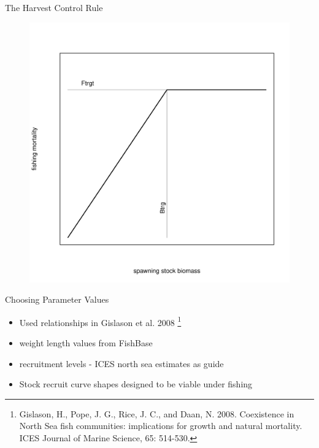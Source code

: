 \documentclass{beamer}
\begin{document}
\begin{withoutheadline}
\begin{frame}{The Harvest Control Rule}
  \begin{figure}
    \begin{center}
    \includegraphics[width=.65\textwidth]{hcr}    
    \end{center}
  \end{figure}
\end{frame}
\end{withoutheadline}



\begin{withoutheadline}
\begin{frame}{Choosing Parameter Values}
  \begin{itemize}
    \item Used relationships in Gislason et al. 2008 \footnote{Gislason, H., Pope, J. G., Rice, J. C., and Daan, N. 2008. Coexistence in North Sea fish communities: implications for growth and natural mortality. ICES Journal of Marine Science, 65: 514-530.}
    \item weight length values from FishBase
    \item recruitment levels - ICES north sea estimates as guide
    \item Stock recruit curve shapes designed to be viable under fishing
  \end{itemize}
\end{frame}
\end{withoutheadline}
\end{document}
